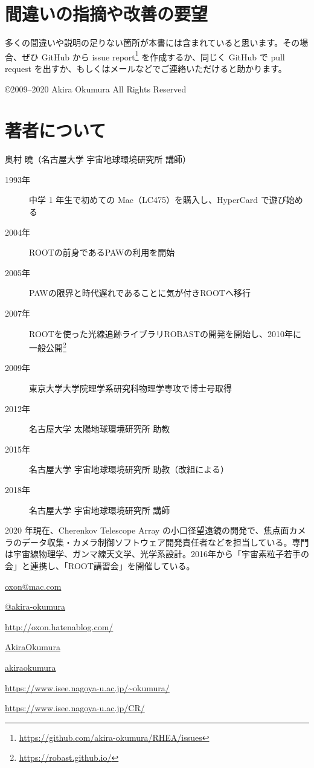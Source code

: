 \documentclass[oneside,uplatex]{jsbook}
\makeatletter
\def\@listoflistenv{[NoFloat][listings][lstlisting]}
\newif\if@expire@floats \@expire@floatsfalse
\def\begin#1{%
   \@ifundefined{#1}%
      {\def\reserved@a{\@latex@error{Environment #1 undefined}\@eha}}%
      {\def\reserved@a{\def\@currenvir{#1}%
          \edef\@currenvline{\on@line}%
          \@check@listenv
          \csname #1\endcsname}}%
       \@ignorefalse
   \begingroup\@endpefalse\reserved@a}
\def\@check@listenv{%
   \@expandtwoargs\in@{[\@currenvir]}{\@listoflistenv}%
   \ifin@ \@expire@floatstrue \fi}
\makeatother
\begin{document}
\section*{間違いの指摘や改善の要望}
多くの間違いや説明の足りない箇所が本書には含まれていると思います。その場合、ぜひ GitHub から issue report\footnote{\url{https://github.com/akira-okumura/RHEA/issues}} を作成するか、同じく GitHub で pull request を出すか、もしくはメールなどでご連絡いただけると助かります。

\begin{flushright}
©2009--2020 Akira Okumura All Rights Reserved
\end{flushright}

\pagebreak

\section*{著者について}
{\large 奥村 曉（名古屋大学 宇宙地球環境研究所 講師）}
         
\begin{description}
  \item[\quad1993年]中学 1 年生で初めての Mac（LC475）を購入し、HyperCard で遊び始める
  \item[\quad2004年]ROOTの前身であるPAWの利用を開始
  \item[\quad2005年]PAWの限界と時代遅れであることに気が付きROOTへ移行
  \item[\quad2007年]ROOTを使った光線追跡ライブラリROBASTの開発を開始し、2010年に一般公開\footnote{\url{https://robast.github.io/}}
  \item[\quad2009年]東京大学大学院理学系研究科物理学専攻で博士号取得
  \item[\quad2012年]名古屋大学 太陽地球環境研究所 助教
  \item[\quad2015年]名古屋大学 宇宙地球環境研究所 助教（改組による）
  \item[\quad2018年]名古屋大学 宇宙地球環境研究所 講師
\end{description}

2020 年現在、Cherenkov Telescope Array の小口径望遠鏡の開発で、焦点面カメラのデータ収集・カメラ制御ソフトウェア開発責任者などを担当している。専門は宇宙線物理学、ガンマ線天文学、光学系設計。2016年から「宇宙素粒子若手の会」と連携し、「ROOT講習会」を開催している。

\begin{description}[labelwidth=2.cm]
  \item[\quad 電子メール]\url{oxon@mac.com}
  \item[\quad GitHub]\href{https://github.com/akira-okumura}{@akira-okumura}
  \item[\quad blog]\url{http://oxon.hatenablog.com/}
  \item[\quad Twitter]\href{https://twitter.com/AkiraOkumura}{AkiraOkumura}
  \item[\quad Flickr]\href{https://www.flickr.com/photos/akiraokumura/}{akiraokumura}
  \item[\quad 個人ページ]\url{https://www.isee.nagoya-u.ac.jp/~okumura/}
  \item[\quad 宇宙線物理学研究室（CR研）]\url{https://www.isee.nagoya-u.ac.jp/CR/}
\end{description}
\end{document}
